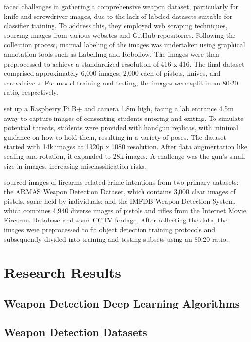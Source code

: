\citet{rfc17} faced challenges in gathering a comprehensive weapon dataset, particularly for knife and screwdriver images, due to the lack of labeled datasets suitable for classifier training. To address this, they employed web scraping techniques, sourcing images from various websites and GitHub repositories. Following the collection process, manual labeling of the images was undertaken using graphical annotation tools such as LabelImg and Roboflow. The images were then preprocessed to achieve a standardized resolution of 416 x 416. The final dataset comprised approximately 6,000 images: 2,000 each of pistols, knives, and screwdrivers. For model training and testing, the images were split in an 80:20 ratio, respectively.

\citet{rfc19} set up a Raspberry Pi B+ and camera 1.8m high, facing a lab entrance 4.5m away to capture images of consenting students entering and exiting. To simulate potential threats, students were provided with handgun replicas, with minimal guidance on how to hold them, resulting in a variety of poses. The dataset started with 14k images at 1920p x 1080 resolution. After data augmentation like scaling and rotation, it expanded to 28k images. A challenge was the gun's small size in images, increasing misclassification risks.

\citet{rfc20} sourced images of firearms-related crime intentions from two primary datasets: the ARMAS Weapon Detection Dataset, which contains 3,000 clear images of pistols, some held by individuals; and the IMFDB Weapon Detection System, which combines 4,940 diverse images of pistols and rifles from the Internet Movie Firearms Database and some CCTV footage. After collecting the data, the images were preprocessed to fit object detection training protocols and subsequently divided into training and testing subsets using an 80:20 ratio.

\section{Research Results}
\subsection{Weapon Detection Deep Learning Algorithms}
\subsection{Weapon Detection Datasets}